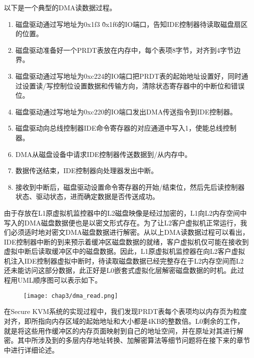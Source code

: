 以下是一个典型的DMA读数据过程。

\begin{enumerate}
\item 磁盘驱动通过写地址为0x1f3 \~0x1f6的IO端口，告知IDE控制器待读取磁盘扇区的位置。

\item 磁盘驱动准备好一个PRDT表放在内存中，每个表项8字节，对齐到4字节边界。

\item 磁盘驱动通过写地址为0xc224的IO端口把PRDT表的起始地址设置好，同时通过设置读/写控制位设置数据和传输方向，清除状态寄存器中的中断位和错误位。

\item 磁盘驱动通过写地址为0xc220的IO端口发出DMA传送指令到IDE控制器。

\item 磁盘驱动向总线控制器IDE命令寄存器的对应通道中写入1，使能总线控制器。

\item DMA从磁盘设备中请求IDE控制器传送数据到/从内存中。

\item 数据传送结束，IDE控制器向处理器发出中断。

\item 接收到中断后，磁盘驱动设置命令寄存器的开始/结束位，然后先后读控制器状态、驱动状态，进而确定数据是否传送成功。
\end{enumerate}

由于存放在L1原虚拟机监控器中的L2磁盘映像是经过加密的，L1向L2内存空间中写入的DMA磁盘数据便也是以密文形式存在。为了让L2客户虚拟机正常运行，我们必须适时地对密文DMA磁盘数据进行解密。从以上DMA读数据过程可以看出，IDE控制器中断的到来预示着缓冲区磁盘数据的就绪，客户虚拟机仅可能在接收到虚拟中断后读取缓冲区中的磁盘数据。因此，L1原虚拟机监控器在向L2客户虚拟机注入IDE控制器虚拟中断时，待读取磁盘数据已经完整存在于L2内存空间而L2还未能访问这部分数据，此正好是L0嵌套式虚拟化层解密磁盘数据的时机。此过程用UML顺序图可以表示如下。

\begin{figure}[!htbp]
  \centering
  \texttt{[image: chap3/dma\_read.png]}
\end{figure}

在Secure KVM系统的实现过程中，我们发现PRDT表每个表项均以内存页为粒度对齐，即所指向内存区域的起始地址和大小都是4KB的整数倍。L0剩余的工作，就是将这些用作缓冲区的内存页面映射到自己的地址空间，并在原址对其进行解密。其中所涉及到的多层内存地址转换、加解密算法等细节问题将在接下来的章节中进行详细论述。

